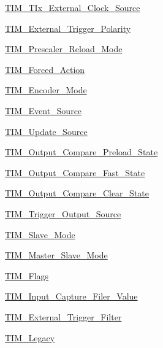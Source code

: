 \begin{DoxyCompactItemize}
\item 
\mbox{\hyperlink{group___t_i_m___t_ix___external___clock___source}{T\+I\+M\+\_\+\+T\+Ix\+\_\+\+External\+\_\+\+Clock\+\_\+\+Source}}
\item 
\mbox{\hyperlink{group___t_i_m___external___trigger___polarity}{T\+I\+M\+\_\+\+External\+\_\+\+Trigger\+\_\+\+Polarity}}
\item 
\mbox{\hyperlink{group___t_i_m___prescaler___reload___mode}{T\+I\+M\+\_\+\+Prescaler\+\_\+\+Reload\+\_\+\+Mode}}
\item 
\mbox{\hyperlink{group___t_i_m___forced___action}{T\+I\+M\+\_\+\+Forced\+\_\+\+Action}}
\item 
\mbox{\hyperlink{group___t_i_m___encoder___mode}{T\+I\+M\+\_\+\+Encoder\+\_\+\+Mode}}
\item 
\mbox{\hyperlink{group___t_i_m___event___source}{T\+I\+M\+\_\+\+Event\+\_\+\+Source}}
\item 
\mbox{\hyperlink{group___t_i_m___update___source}{T\+I\+M\+\_\+\+Update\+\_\+\+Source}}
\item 
\mbox{\hyperlink{group___t_i_m___output___compare___preload___state}{T\+I\+M\+\_\+\+Output\+\_\+\+Compare\+\_\+\+Preload\+\_\+\+State}}
\item 
\mbox{\hyperlink{group___t_i_m___output___compare___fast___state}{T\+I\+M\+\_\+\+Output\+\_\+\+Compare\+\_\+\+Fast\+\_\+\+State}}
\item 
\mbox{\hyperlink{group___t_i_m___output___compare___clear___state}{T\+I\+M\+\_\+\+Output\+\_\+\+Compare\+\_\+\+Clear\+\_\+\+State}}
\item 
\mbox{\hyperlink{group___t_i_m___trigger___output___source}{T\+I\+M\+\_\+\+Trigger\+\_\+\+Output\+\_\+\+Source}}
\item 
\mbox{\hyperlink{group___t_i_m___slave___mode}{T\+I\+M\+\_\+\+Slave\+\_\+\+Mode}}
\item 
\mbox{\hyperlink{group___t_i_m___master___slave___mode}{T\+I\+M\+\_\+\+Master\+\_\+\+Slave\+\_\+\+Mode}}
\item 
\mbox{\hyperlink{group___t_i_m___flags}{T\+I\+M\+\_\+\+Flags}}
\item 
\mbox{\hyperlink{group___t_i_m___input___capture___filer___value}{T\+I\+M\+\_\+\+Input\+\_\+\+Capture\+\_\+\+Filer\+\_\+\+Value}}
\item 
\mbox{\hyperlink{group___t_i_m___external___trigger___filter}{T\+I\+M\+\_\+\+External\+\_\+\+Trigger\+\_\+\+Filter}}
\item 
\mbox{\hyperlink{group___t_i_m___legacy}{T\+I\+M\+\_\+\+Legacy}}
\end{DoxyCompactItemize}
